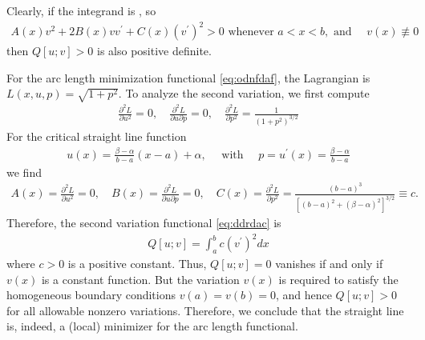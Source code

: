 \documentclass{article}
\begin{document}
Clearly, if the integrand is , so
\begin{align}
    A(x) v^{2}+2 B(x) v v^{\prime}+C(x)\left(v^{\prime}\right)^{2}>0\text{  whenever }a<x<b, \text{ and }\quad v(x) \not \equiv 0\label{eq:donffvcz}
\end{align}
then $Q[u ; v]>0$ is also positive definite.
\begin{exma}
For the arc length minimization functional \cref{eq:odnfdaf}, the Lagrangian is $L(x, u, p)=\sqrt{1+p^{2}}$. To analyze the second variation, we first compute
\begin{align*}
\frac{\partial^{2} L}{\partial u^{2}}=0, \quad \frac{\partial^{2} L}{\partial u \partial p}=0, \quad \frac{\partial^{2} L}{\partial p^{2}}=\frac{1}{\left(1+p^{2}\right)^{3 / 2}}
\end{align*}
For the critical straight line function
\begin{align*}
u(x)=\frac{\beta-\alpha}{b-a}(x-a)+\alpha, \quad \text { with } \quad p=u^{\prime}(x)=\frac{\beta-\alpha}{b-a}
\end{align*}
we find
\begin{align*}
A(x)=\frac{\partial^{2} L}{\partial u^{2}}=0, \quad B(x)=\frac{\partial^{2} L}{\partial u \partial p}=0, \quad C(x)=\frac{\partial^{2} L}{\partial p^{2}}=\frac{(b-a)^{3}}{\left[(b-a)^{2}+(\beta-\alpha)^{2}\right]^{3 / 2}} \equiv c .
\end{align*}
Therefore, the second variation functional \cref{eq:ddrdac} is
\begin{align*}
Q[u ; v]=\int_{a}^{b} c\left(v^{\prime}\right)^{2} d x
\end{align*}
where $c>0$ is a positive constant. Thus, $Q[u ; v]=0$ vanishes if and only if $v(x)$ is a constant function. But the variation $v(x)$ is required to satisfy the homogeneous boundary conditions $v(a)=v(b)=0$, and hence $Q[u ; v]>0$ for all allowable nonzero variations. Therefore, we conclude that the straight line is, indeed, a (local) minimizer for the arc length functional.
\end{exma}
\end{document}
